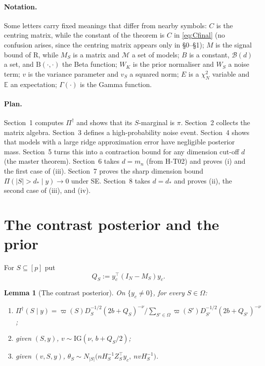 \documentclass[11pt]{article}
\newtheorem{lemma}[theorem]{Lemma}
\theoremstyle{remark}
\newcommand{\E}{\mathbb E}
\newcommand{\Pd}{\Pi^\dagger}
\newcommand{\vp}{\varpi}
\newcommand{\IG}{\mathrm{IG}}
\begin{document}
\paragraph{Notation.} Some letters carry fixed meanings that differ from nearby symbols: $C$ is the centring matrix, while the constant of the theorem is $C$ in \eqref{eq:Cfinal} (no confusion arises, since the centring matrix appears only in \S0--\S1); $M$ is the signal bound of R, while $M_S$ is a matrix and $\mathcal M$ a set of models; $B$ is a constant, $\mathcal B(d)$ a set, and $\mathrm B(\cdot,\cdot)$ the Beta function; $W_K$ is the prior normaliser and $W_S$ a noise term; $v$ is the variance parameter and $v_S$ a squared norm; $E$ is a $\chi^2_N$ variable and $\E$ an expectation; $\Gamma(\cdot)$ is the Gamma function.

\paragraph{Plan.} Section~1 computes $\Pd$ and shows that its $S$-marginal is $\pi$. Section~2 collects the matrix algebra. Section~3 defines a high-probability noise event. Section~4 shows that models with a large ridge approximation error have negligible posterior mass. Section~5 turns this into a contraction bound for any dimension cut-off $d$ (the master theorem). Section~6 takes $d=m_n$ (from H-T02) and proves (i) and the first case of (iii). Section~7 proves the sharp dimension bound $\Pi(|S|>d_\ast\mid y)\to0$ under SE. Section~8 takes $d=d_\ast$ and proves (ii), the second case of (iii), and (iv).

\section{The contrast posterior and the prior}\label{sec:posterior}

For $S\subseteq[p]$ put
\[
Q_S:=y_c^\top(I_N-M_S)y_c .
\]

\begin{lemma}[The contrast posterior]\label{lem:post}
On $\{y_c\ne0\}$, for every $S\in\Omega$:
\begin{enumerate}[label=(\alph*)]
\item $\Pd(S\mid y)=\vp(S)D_S^{-1/2}(2b+Q_S)^{-\nu}\big/\sum_{S'\in\Omega}\vp(S')D_{S'}^{-1/2}(2b+Q_{S'})^{-\nu}$;
\item given $(S,y)$, $v\sim\IG(\nu,\,b+Q_S/2)$;
\item given $(v,S,y)$, $\theta_S\sim N_{|S|}\big(nH_S^{-1}Z_S^\top y_c,\ nvH_S^{-1}\big)$.
\end{enumerate}
\end{lemma}
\end{document}
